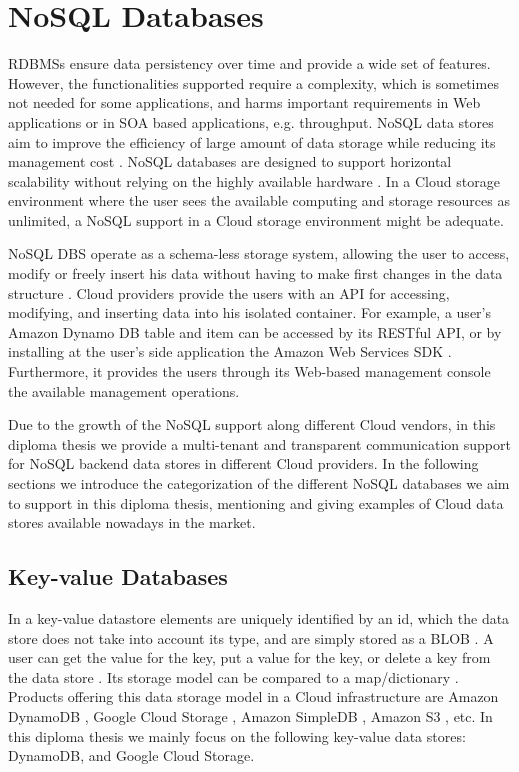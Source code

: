 \section{NoSQL Databases}
\label{sec:fundamentalsnosqldb}  

\ac{RDBMS}s ensure data persistency over time and provide a wide set of features. However, the functionalities supported require a complexity, which is sometimes not needed for some applications, and harms important requirements in Web applications or in \ac{SOA} based applications, e.g. throughput. \ac{NoSQL} data stores aim to improve the efficiency of large amount of data storage while reducing its management cost \cite{nosqlcomputerworld}. NoSQL databases are designed to support horizontal scalability without relying on the highly available hardware \cite{strauchnosql}. In a Cloud storage environment where the user sees the available computing and storage resources as unlimited, a \ac{NoSQL} support in a Cloud storage environment might be adequate.

\ac{NoSQL} \ac{DBS} operate as a schema-less storage system, allowing the user to access, modify or freely insert his data without having to make first changes in the data structure \cite{nosql2012}. Cloud providers provide the users with an \ac{API} for accessing, modifying, and inserting data into his isolated container. For example, a user's Amazon Dynamo DB table and item can be accessed by its RESTful \ac{API}, or by installing at the user's side application the Amazon Web Services SDK \cite{amazondynamodb}. Furthermore, it provides the users through its Web-based management console the available management operations. 

Due to the growth of the \ac{NoSQL} support along different Cloud vendors, in this diploma thesis we provide a multi-tenant and transparent communication support for \ac{NoSQL} backend data stores in different Cloud providers. In the following sections we introduce the categorization of the different \ac{NoSQL} databases we aim to support in this diploma thesis, mentioning and giving examples of Cloud data stores available nowadays in the market.

\subsection{Key-value Databases}

In a key-value datastore elements are uniquely identified by an id, which the data store does not take into account its type, and are simply stored as a \ac{BLOB} . A user can get the value for the key, put a value for the key, or delete a key from the data store \cite{nosql2012}. Its storage model can be compared to a map/dictionary \cite{strauchnosql}. Products offering this data storage model in a Cloud infrastructure are Amazon DynamoDB \cite{amazondynamodb}, Google Cloud Storage \cite{googlecloudstorage}, Amazon SimpleDB  \cite{amazonsimpledb} , Amazon S3 \cite{amazons3}, etc. In this diploma thesis we mainly focus on the following key-value data stores: DynamoDB, and Google Cloud Storage.

